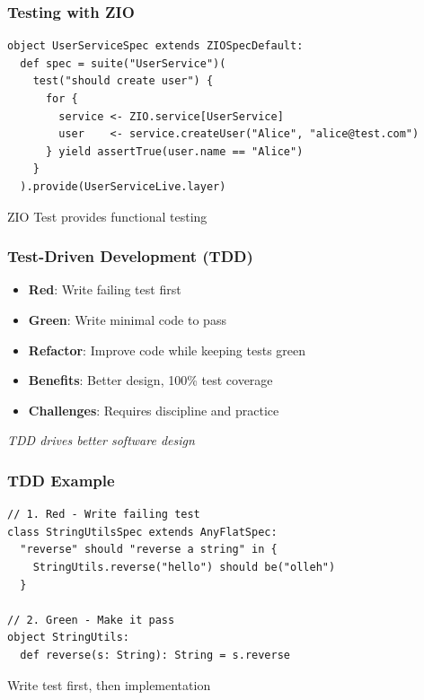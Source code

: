 \documentclass{beamer}
\begin{document}
\begin{frame}[fragile]
\frametitle{Testing with ZIO}

\begin{lstlisting}[style=scalaStyle]
object UserServiceSpec extends ZIOSpecDefault:
  def spec = suite("UserService")(
    test("should create user") {
      for {
        service <- ZIO.service[UserService]
        user    <- service.createUser("Alice", "alice@test.com")
      } yield assertTrue(user.name == "Alice")
    }
  ).provide(UserServiceLive.layer)
\end{lstlisting}

ZIO Test provides functional testing

\end{frame}

\begin{frame}
\frametitle{Test-Driven Development (TDD)}

\begin{itemize}
  \item \textbf{Red}: Write failing test first
  \item \textbf{Green}: Write minimal code to pass
  \item \textbf{Refactor}: Improve code while keeping tests green
  \item \textbf{Benefits}: Better design, 100\% test coverage
  \item \textbf{Challenges}: Requires discipline and practice
\end{itemize}

\vspace{0.3cm}
\textit{TDD drives better software design}

\end{frame}

\begin{frame}[fragile]
\frametitle{TDD Example}

\begin{lstlisting}[style=scalaStyle]
// 1. Red - Write failing test
class StringUtilsSpec extends AnyFlatSpec:
  "reverse" should "reverse a string" in {
    StringUtils.reverse("hello") should be("olleh")
  }

// 2. Green - Make it pass
object StringUtils:
  def reverse(s: String): String = s.reverse
\end{lstlisting}

Write test first, then implementation

\end{frame}
\end{document}
